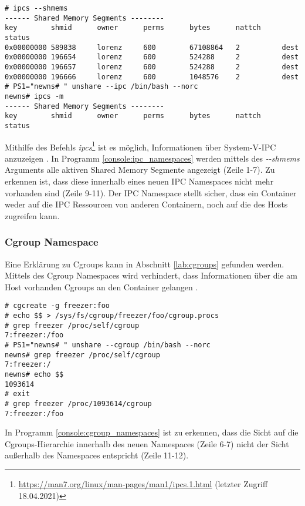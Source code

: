 \begin{lstlisting}[label={console:ipc_namespaces},caption={Beispiel für IPC Namespace}]
# ipcs --shmems
------ Shared Memory Segments --------
key        shmid      owner      perms      bytes      nattch     status      
0x00000000 589838     lorenz     600        67108864   2          dest         
0x00000000 196654     lorenz     600        524288     2          dest         
0x00000000 196657     lorenz     600        524288     2          dest         
0x00000000 196666     lorenz     600        1048576    2          dest         
# PS1="newns# " unshare --ipc /bin/bash --norc
newns# ipcs -m
------ Shared Memory Segments --------
key        shmid      owner      perms      bytes      nattch     status      
\end{lstlisting}

Mithilfe des Befehls
\emph{ipcs}\footnote{\url{https://man7.org/linux/man-pages/man1/ipcs.1.html}
(letzter Zugriff 18.04.2021)} ist es möglich, Informationen über System-V-IPC
anzuzeigen \cite{man_ipcs}. In Programm \ref{console:ipc_namespaces} werden
mittels des \emph{-{}-shmems} Arguments alle aktiven Shared Memory Segmente
angezeigt (Zeile 1-7). Zu erkennen ist, dass diese innerhalb eines neuen IPC
Namespaces nicht mehr vorhanden sind (Zeile 9-11). Der IPC Namespace stellt
sicher, dass ein Container weder auf die IPC Ressourcen von anderen Containern,
noch auf die des Hosts zugreifen kann.

\subsubsection{Cgroup Namespace}
Eine Erklärung zu Cgroups kann in Abschnitt \ref{lab:cgroups} gefunden werden.
Mittels des Cgroup Namespaces wird verhindert, dass Informationen über die am
Host vorhanden Cgroups an den Container gelangen \cite{lwn_cgroups}.

\begin{lstlisting}[label={console:cgroup_namespaces},caption={Beispiel für Cgroup Namespace}]
# cgcreate -g freezer:foo
# echo $$ > /sys/fs/cgroup/freezer/foo/cgroup.procs
# grep freezer /proc/self/cgroup
7:freezer:/foo
# PS1="newns# " unshare --cgroup /bin/bash --norc
newns# grep freezer /proc/self/cgroup
7:freezer:/
newns# echo $$
1093614
# exit
# grep freezer /proc/1093614/cgroup
7:freezer:/foo
\end{lstlisting}

In Programm \ref{console:cgroup_namespaces} ist zu erkennen, dass die Sicht auf
die Cgroups-Hierarchie innerhalb des neuen Namespaces (Zeile 6-7) nicht der
Sicht au{\ss}erhalb des Namespaces entspricht (Zeile 11-12).

